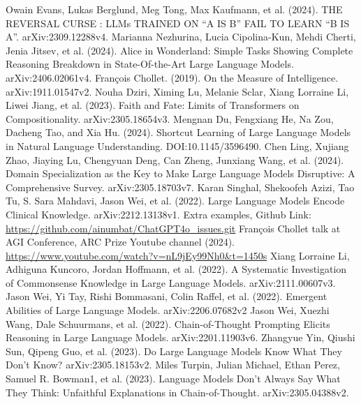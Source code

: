 \documentclass[11pt]{scrartcl}
\begin{document}
\begin{thebibliography}{14}  %

	Owain Evans, Lukas Berglund, Meg Tong, Max Kaufmann, et al. (2024). THE REVERSAL CURSE : LLMs TRAINED ON “A IS B” FAIL TO LEARN “B IS A”. arXiv:2309.12288v4.      
    Marianna Nezhurina, Lucia Cipolina-Kun, Mehdi Cherti, Jenia Jitsev, et al. (2024). Alice in Wonderland: Simple Tasks Showing Complete Reasoning Breakdown in State-Of-the-Art Large Language Models. arXiv:2406.02061v4.
    François Chollet. (2019). On the Measure of Intelligence. arXiv:1911.01547v2.
    Nouha Dziri, Ximing Lu, Melanie Sclar, Xiang Lorraine Li, Liwei Jiang, et al. (2023). Faith and Fate: Limits of Transformers on Compositionality. arXiv:2305.18654v3.
    Mengnan Du, Fengxiang He, Na Zou, Dacheng Tao, and Xia Hu. (2024). Shortcut Learning of Large Language Models in Natural Language Understanding. DOI:10.1145/3596490.
    Chen Ling, Xujiang Zhao, Jiaying Lu, Chengyuan Deng, Can Zheng, Junxiang Wang, et al. (2024). Domain Specialization as the Key to Make Large Language Models Disruptive: A Comprehensive Survey. arXiv:2305.18703v7.
	Karan Singhal, Shekoofeh Azizi, Tao Tu, S. Sara Mahdavi, Jason Wei, et al. (2022). Large Language Models Encode Clinical Knowledge. arXiv:2212.13138v1.
	Extra examples, Github Link: \url{https://github.com/ainumbat/ChatGPT4o_issues.git}
	François Chollet talk at AGI Conference, ARC Prize Youtube channel (2024). \url{https://www.youtube.com/watch?v=nL9jEy99Nh0&t=1450s}
	Xiang Lorraine Li, Adhiguna Kuncoro, Jordan Hoffmann, et al. (2022). A Systematic Investigation of Commonsense Knowledge in Large Language Models. arXiv:2111.00607v3.
	Jason Wei, Yi Tay, Rishi Bommasani, Colin Raffel, et al. (2022). Emergent Abilities of Large Language Models. arXiv:2206.07682v2 
	Jason Wei, Xuezhi Wang, Dale Schuurmans, et al. (2022). Chain-of-Thought Prompting Elicits Reasoning in Large Language Models. arXiv:2201.11903v6.     
	Zhangyue Yin, Qiushi Sun, Qipeng Guo, et al. (2023). Do Large Language Models Know What They Don’t Know? arXiv:2305.18153v2.
    Miles Turpin, Julian Michael, Ethan Perez, Samuel R. Bowman1, et al. (2023). Language Models Don’t Always Say What They Think: Unfaithful Explanations in Chain-of-Thought. arXiv:2305.04388v2. 
\end{thebibliography}
\end{document}
